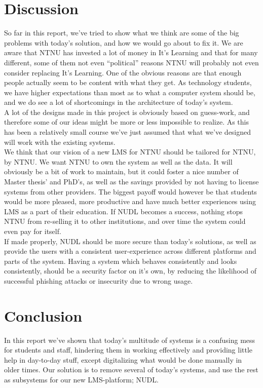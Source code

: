 \section{Discussion}

So far in this report, we've tried to show what we think are some of the big problems with today's solution, and how we would go about to fix it. We are aware that NTNU
has invested a lot of money in It's Learning and that for many different, some of them not even ``political'' reasons NTNU will probably not even consider replacing It's Learning. One 
of the obvious reasons are that enough people actually seem to be content with what they get. As technology students, we have higher expectations than most as to what a computer system should be, and we do see a lot of shortcomings in the architecture of today's system.\\

\noindent
A lot of the designs made in this project is obviously based on guess-work, and therefore some of our ideas might be more or less impossible to realize. As this has been a relatively small course we've just assumed that what we've designed will work with the existing systems. \\

\noindent
We think that our vision of a new LMS for NTNU should be tailored for NTNU, by NTNU. We want NTNU to own the system as well as the data. It will obviously be a bit of work to 
maintain, but it could foster a nice number of Master thesis' and PhD's, as well as the savings provided by not having to license systems from other providers. The biggest payoff 
would however be that students would be more pleased, more productive and have much better experiences using LMS as a part of their education. If NUDL becomes a success, nothing stops 
NTNU from re-selling it to other institutions, and over time the system could even pay for itself.\\

\noindent
If made properly, NUDL should be more secure than today's solutions, as well as provide the users with a consistent user-experience across different platforms and parts of the system. Having a 
system which behaves consistently and looks consistently, should be a security factor on it's own, by reducing the likelihood of successful phishing attacks or insecurity due to wrong 
usage. 


\newpage
\section{Conclusion}
In this report we've shown that today's multitude of systems is a confusing mess for students and staff, hindering them in working effectively and providing little help in day-to-day 
stuff, except digitalizing what would be done manually in older times. Our solution is to remove several of today's systems, and use the rest as subsystems for our new LMS-platform; NUDL. \\

